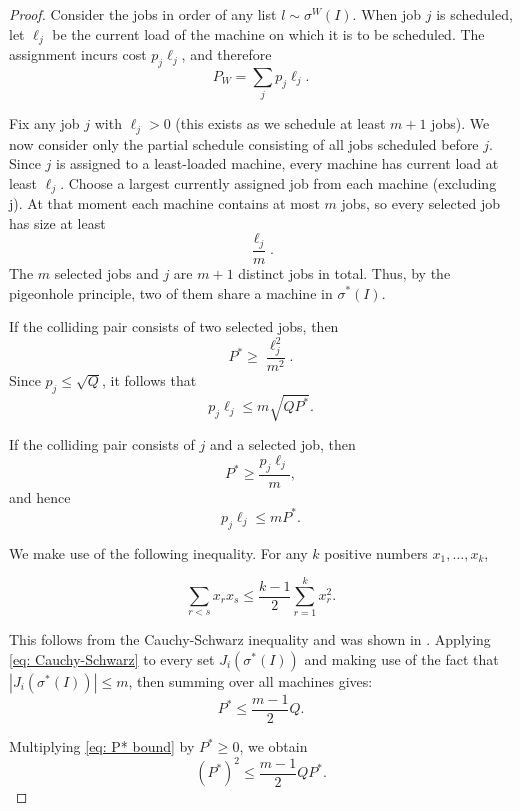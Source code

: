 \documentclass[%
english, titlepage=false %
]{./tum-templates/book/tumbook}
\begin{document}
\begin{proof}
Consider the jobs in order of any list $l \sim \sigma^{W}(I)$.  When job \(j\) is scheduled, let \(\ell_j\)
be the current load of the machine on which it is to be scheduled. The assignment incurs 
cost \(p_j\ell_j\), and therefore
\[
 P_{W}=\sum_jp_j\ell_j.
\]

\noindent
Fix any job \(j\) with \(\ell_j>0\) (this exists as we schedule at least $m+1$ jobs).
We now consider only the partial schedule consisting of all jobs scheduled before $j$.
Since $j$ is assigned to a least-loaded machine,
every machine has current load at least \(\ell_j\).
Choose a largest currently assigned job from each machine (excluding j).  At that moment
each machine contains at most \(m\) jobs, so every selected job has size at
least
\[
 \frac{\ell_j}{m}.
\]
The \(m\) selected jobs and \(j\) are \(m+1\) distinct jobs in total. Thus, by the pigeonhole principle,
two of them share a machine in $\sigma^*(I)$.

\noindent
If the colliding pair consists of two selected jobs, then
\[
 P^*\ge\frac{\ell_j^2}{m^2}.
\]
Since \(p_j\le\sqrt Q\), it follows that
\begin{equation}
 p_j\ell_j\le m\sqrt{QP^*}.
 \label{eq: pjlj-bound}
\end{equation}

\noindent
If the colliding pair consists of \(j\) and a selected job, then
\[
 P^*\ge\frac{p_j\ell_j}{m},
\]
and hence
\begin{equation}
 p_j\ell_j\le mP^*.
 \label{eq: pjlj-bound-2}
\end{equation}

\noindent
We make use of the following inequality. 
For any \(k\) positive numbers \(x_1,\ldots,x_k\),

\begin{equation}
 \sum_{r<s}x_rx_s
 \le \frac{k-1}{2}\sum_{r=1}^kx_r^2.
 \label{eq: Cauchy-Schwarz}
\end{equation}

This follows from the Cauchy-Schwarz inequality and was shown in \cite{rozenberg2020inequality}.
\noindent
Applying \eqref{eq: Cauchy-Schwarz} to every  set $J_{i}(\sigma^{*}(I))$ and making use of the fact that $|J_{i}(\sigma^{*}(I))|\le m$, then summing over all machines gives:
\begin{equation}
 P^*\le\frac{m-1}{2}Q.
\label{eq: P* bound}
\end{equation}

\noindent
Multiplying \eqref{eq: P* bound} by \(P^*\ge 0\), we obtain
\[
(P^*)^2
\le
\frac{m-1}{2}QP^*.
\]


\end{proof}
\end{document}
